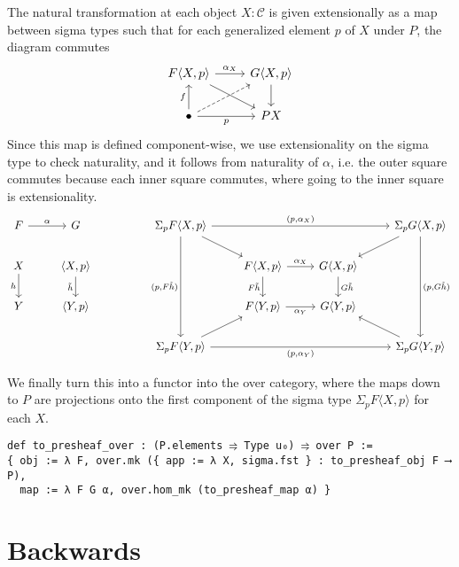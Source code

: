 \documentclass{article}
\newcommand{\al}{\alpha}
\newcommand{\CC}{\mathcal{C}}
\newcommand{\<}{\langle}
\renewcommand{\>}{\rangle}
\theoremstyle{definitionstyle}
\theoremstyle{exercisestyle}
\theoremstyle{remarkstyle}
\begin{document}
The natural transformation at each object $X : \CC$ is
given extensionally as a map between sigma types such that for each
generalized element $p$ of $X$ under $P$, the diagram commutes
\[\begin{tikzcd}
	{F \< X , p \>} & {G\<X,p\>} \\
	\bullet & PX
	\arrow["{\alpha _X}", from=1-1, to=1-2]
	\arrow["f", from=2-1, to=1-1]
	\arrow["p"', from=2-1, to=2-2]
	\arrow[from=1-2, to=2-2]
	\arrow[from=1-1, to=2-2]
	\arrow[dashed, from=2-1, to=1-2]
\end{tikzcd}\]
Since this map is defined component-wise,
we use extensionality on the sigma type to check naturality,
and it follows from naturality of $\al$,
i.e. the outer square commutes because each inner square commutes,
where going to the inner square is extensionality.
\[\begin{tikzcd}
	F & G && {\Sigma_p F\<X,p\>} &&& {\Sigma_p G\<X,p\>} \\
	X & {\< X , p \>} &&& {F\<X,p\>} & {G\<X,p\>} \\
	Y & {\< Y , p \>} &&& {F\<Y,p\>} & {G\<Y,p\>} \\
	&&& {\Sigma_p F\<Y,p\>} &&& {\Sigma_p G\<Y,p\>}
	\arrow["h"', from=2-1, to=3-1]
	\arrow["{\tilde{h}}"', from=2-2, to=3-2]
	\arrow["\alpha", from=1-1, to=1-2]
	\arrow["{(p,\alpha_X)}", from=1-4, to=1-7]
	\arrow["{(p,F \tilde{h})}"', from=1-4, to=4-4]
	\arrow["{(p,\alpha_Y)}"', from=4-4, to=4-7]
	\arrow["{(p,G \tilde{h})}", from=1-7, to=4-7]
	\arrow["{\alpha_X}", from=2-5, to=2-6]
	\arrow["{F \tilde{h}}"', from=2-5, to=3-5]
	\arrow["{\alpha_Y}"', from=3-5, to=3-6]
	\arrow["{G \tilde{h}}", from=2-6, to=3-6]
	\arrow[from=4-4, to=3-5]
	\arrow[from=1-4, to=2-5]
	\arrow[from=1-7, to=2-6]
	\arrow[from=4-7, to=3-6]
\end{tikzcd}\]

We finally turn this into a functor into the over category,
where the maps down to $P$ are projections onto the first component
of the sigma type $\Sigma_{p} F \< X , p \>$ for each $X$.

\begin{lstlisting}
def to_presheaf_over : (P.elements ⥤ Type u₀) ⥤ over P :=
{ obj := λ F, over.mk ({ app := λ X, sigma.fst } : to_presheaf_obj F ⟶ P),
  map := λ F G α, over.hom_mk (to_presheaf_map α) } \end{lstlisting}

\section{Backwards}

{}

\end{document}
